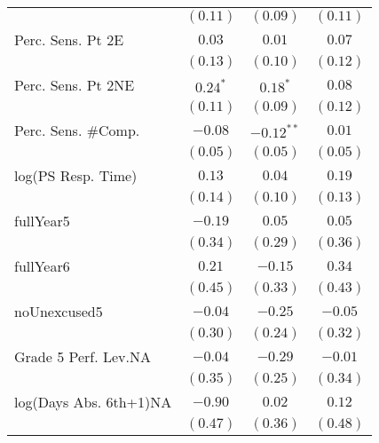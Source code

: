 \begin{center}
\begin{longtable}{l c c c}
                                                   & $(0.11)$     & $(0.09)$     & $(0.11)$     \\
Perc. Sens. Pt 2E                             & $0.03$       & $0.01$       & $0.07$       \\
                                                   & $(0.13)$     & $(0.10)$     & $(0.12)$     \\
Perc. Sens. Pt 2NE                            & $0.24^{*}$   & $0.18^{*}$   & $0.08$       \\
                                                   & $(0.11)$     & $(0.09)$     & $(0.12)$     \\
Perc. Sens. \#Comp.                            & $-0.08$      & $-0.12^{**}$ & $0.01$       \\
                                                   & $(0.05)$     & $(0.05)$     & $(0.05)$     \\
log(PS Resp. Time)                            & $0.13$       & $0.04$       & $0.19$       \\
                                                   & $(0.14)$     & $(0.10)$     & $(0.13)$     \\
fullYear5                                          & $-0.19$      & $0.05$       & $0.05$       \\
                                                   & $(0.34)$     & $(0.29)$     & $(0.36)$     \\
fullYear6                                          & $0.21$       & $-0.15$      & $0.34$       \\
                                                   & $(0.45)$     & $(0.33)$     & $(0.43)$     \\
noUnexcused5                                       & $-0.04$      & $-0.25$      & $-0.05$      \\
                                                   & $(0.30)$     & $(0.24)$     & $(0.32)$     \\
Grade 5 Perf. Lev.NA                               & $-0.04$      & $-0.29$      & $-0.01$      \\
                                                   & $(0.35)$     & $(0.25)$     & $(0.34)$     \\
log(Days Abs. 6th+1)NA                                      & $-0.90$      & $0.02$       & $0.12$       \\
                                                   & $(0.47)$     & $(0.36)$     & $(0.48)$     \\

\end{longtable}
\end{center}
